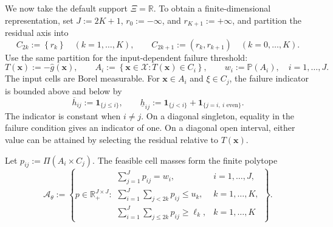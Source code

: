 We now take the default support $\Xi=\mathbb R$. To obtain a finite-dimensional representation, set $J:=2K+1$, $r_0:=-\infty$, and $r_{K+1}:=+\infty$, and partition the residual axis into
\begin{equation}
  C_{2k}:=\left\{r_k\right\}\quad(k=1,\ldots,K),\qquad
  C_{2k+1}:=\left(r_k,r_{k+1}\right)\quad(k=0,\ldots,K).
  \label{eq-residual-cells}
\end{equation}
Use the same partition for the input-dependent failure threshold:
\begin{equation}
  T(\bm x):=-\hat g(\bm x),\qquad
  A_i:=\left\{\bm x\in\mathcal X:T(\bm x)\in C_i\right\},\qquad
  w_i:=\mathbb P\left(A_i\right),\quad i=1,\ldots,J.
  \label{eq-input-cells}
\end{equation}
The input cells are Borel measurable. For $\bm x\in A_i$ and $\xi\in C_j$, the failure indicator is bounded above and below by
\begin{equation}
  \overline h_{ij}:=\mathbf1_{\{j\le i\}},\qquad
  \underline h_{ij}:=\mathbf1_{\{j<i\}}+\mathbf1_{\{j=i,\ i\text{ even}\}}.
  \label{eq-cell-costs}
\end{equation}
The indicator is constant when $i\ne j$. On a diagonal singleton, equality in the failure condition gives an indicator of one. On a diagonal open interval, either value can be attained by selecting the residual relative to $T(\bm x)$.

Let $p_{ij}:=\Pi(A_i\times C_j)$. The feasible cell masses form the finite polytope
\begin{equation}
  \mathcal A_\theta:=
  \left\{p\in\mathbb R_+^{J\times J}:
  \begin{array}{ll}
    \displaystyle\sum_{j=1}^Jp_{ij}=w_i,&i=1,\ldots,J,\\[1mm]
    \displaystyle\sum_{i=1}^J\sum_{j<2k}p_{ij}\le u_k,&k=1,\ldots,K,\\[1mm]
    \displaystyle\sum_{i=1}^J\sum_{j\le2k}p_{ij}\ge\ell_k,&k=1,\ldots,K
  \end{array}\right\}.
  \label{eq-cell-mass-polytope}
\end{equation}


